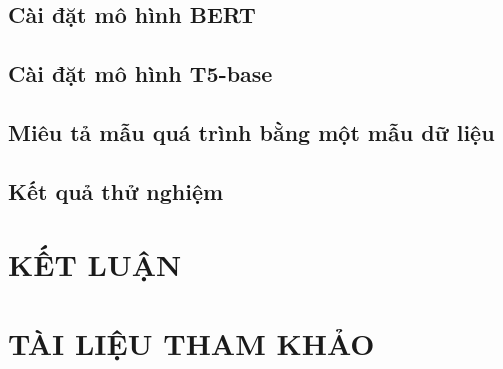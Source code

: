\documentclass[12pt,a4paper]{report}
\begin{document}
\section{Cài đặt mô hình BERT}

\section{Cài đặt mô hình T5-base}

\section{Miêu tả mẫu quá trình bằng một mẫu dữ liệu}

\section{Kết quả thử nghiệm}



\chapter{KẾT LUẬN}

\chapter*{TÀI LIỆU THAM KHẢO}

\end{document}
